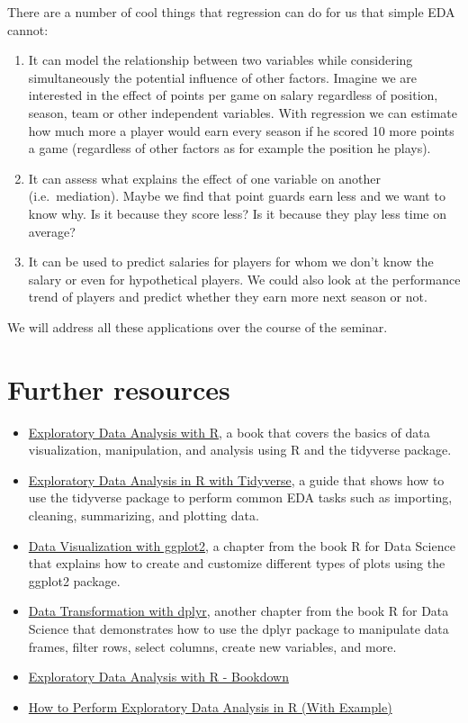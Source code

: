 \documentclass[
]{book}
\providecommand{\tightlist}{%
  \setlength{\itemsep}{0pt}\setlength{\parskip}{0pt}}
\begin{document}
There are a number of cool things that regression can do for us that simple EDA cannot:

\begin{enumerate}
\def\labelenumi{\arabic{enumi})}
\item
  It can model the relationship between two variables while considering simultaneously the potential influence of other factors. Imagine we are interested in the effect of points per game on salary regardless of position, season, team or other independent variables. With regression we can estimate how much more a player would earn every season if he scored 10 more points a game (regardless of other factors as for example the position he plays).
\item
  It can assess what explains the effect of one variable on another (i.e.~mediation). Maybe we find that point guards earn less and we want to know why. Is it because they score less? Is it because they play less time on average?
\item
  It can be used to predict salaries for players for whom we don't know the salary or even for hypothetical players. We could also look at the performance trend of players and predict whether they earn more next season or not.
\end{enumerate}

We will address all these applications over the course of the seminar.

\hypertarget{further-resources}{%
\section{Further resources}\label{further-resources}}

\begin{itemize}
\tightlist
\item
  \href{https://tuos-bio-data-skills.github.io/intro-eda-book/index.html}{Exploratory Data Analysis with R}, a book that covers the basics of data visualization, manipulation, and analysis using R and the tidyverse package.
\item
  \href{https://www.pluralsight.com/guides/exploratory-data-analysis-in-r}{Exploratory Data Analysis in R with Tidyverse}, a guide that shows how to use the tidyverse package to perform common EDA tasks such as importing, cleaning, summarizing, and plotting data.
\item
  \href{https://r4ds.had.co.nz/data-visualisation.html}{Data Visualization with ggplot2}, a chapter from the book R for Data Science that explains how to create and customize different types of plots using the ggplot2 package.
\item
  \href{https://r4ds.had.co.nz/transform.html}{Data Transformation with dplyr}, another chapter from the book R for Data Science that demonstrates how to use the dplyr package to manipulate data frames, filter rows, select columns, create new variables, and more.
\item
  \href{https://bookdown.org/rdpeng/exdata/}{Exploratory Data Analysis with R - Bookdown}
\item
  \href{https://www.statology.org/exploratory-data-analysis-in-r/}{How to Perform Exploratory Data Analysis in R (With Example)}
\end{itemize}
\end{document}
